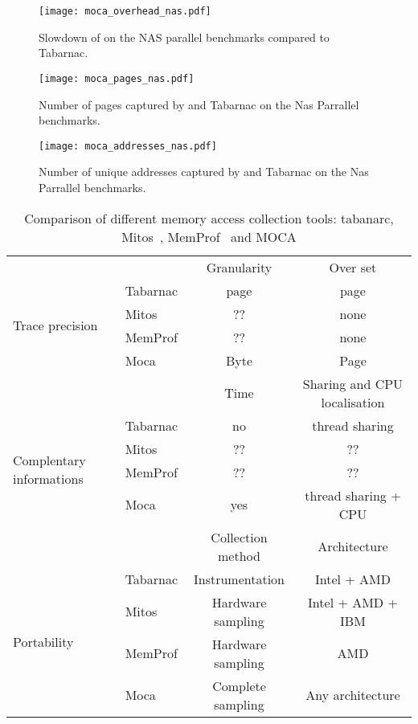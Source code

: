 \begin{figure}[htb]
    \centering
    \texttt{[image: moca\_overhead\_nas.pdf]}
    \caption{Slowdown of \Moca on the NAS parallel benchmarks compared to
    Tabarnac.}
    \label{fig:ovh}
\end{figure}

\begin{figure}[htb]
    \centering
    \texttt{[image: moca\_pages\_nas.pdf]}
    \caption{Number of pages captured by \Moca and Tabarnac on the Nas
    Parrallel benchmarks.}
    \label{fig:pages}
\end{figure}

\begin{figure}[htb]
    \centering
    \texttt{[image: moca\_addresses\_nas.pdf]}
    \caption{Number of unique addresses captured by \Moca and Tabarnac on the Nas
    Parrallel benchmarks.}
    \label{fig:addr}
\end{figure}

\begin{table}
    \centering
    \begin{tabular}{p{1.3cm}lcc}
        \toprule
        & & Granularity & Over set \\
        \cmidrule(lr){3-4}
        \multirow{4}{.8cm}{Trace precision}
        & Tabarnac & page & page \\
        & Mitos & ?? & none \\
        & MemProf & ?? & none \\
        & Moca & Byte & Page \\
        \midrule
        & & Time & Sharing and CPU localisation \\
        \cmidrule(lr){3-4}
        \multirow{4}{.8cm}{Complentary informations}
        & Tabarnac & no & thread sharing\\
        & Mitos & ?? & ?? \\
        & MemProf & ?? & ?? \\
        & Moca & yes & thread sharing + CPU \\
        \midrule
        & & Collection method & Architecture \\
        \cmidrule(lr){3-4}
        \multirow{4}{.8cm}{Portability}
        & Tabarnac & Instrumentation & Intel + AMD \\
        & Mitos & Hardware sampling & Intel + AMD + IBM \\
        & MemProf & Hardware sampling & AMD \\
        & Moca & Complete sampling & Any architecture\\
        \bottomrule
    \end{tabular}
    \caption{Comparison of different memory access collection
        tools: tabanarc\cite{Beniamine15TABARNACRR},
        Mitos~\cite{Gimenez14Dissecting},
        MemProf~\cite{Lachaize12MemProf} and MOCA}
        \label{tab:tools-comp}
\end{table}

